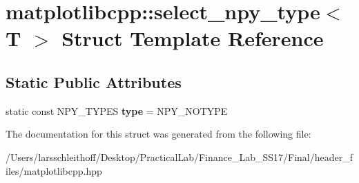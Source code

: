 \hypertarget{structmatplotlibcpp_1_1select__npy__type}{}\section{matplotlibcpp\+:\+:select\+\_\+npy\+\_\+type$<$ T $>$ Struct Template Reference}
\label{structmatplotlibcpp_1_1select__npy__type}
\subsection*{Static Public Attributes}
\begin{DoxyCompactItemize}
\item 
\mbox{\label{structmatplotlibcpp_1_1select__npy__type_acbffa4e6e1d047b52e12330446816c9c}} 
static const N\+P\+Y\+\_\+\+T\+Y\+P\+ES {\bfseries type} = N\+P\+Y\+\_\+\+N\+O\+T\+Y\+PE
\end{DoxyCompactItemize}


The documentation for this struct was generated from the following file\+:\begin{DoxyCompactItemize}
\item 
/\+Users/larsschleithoff/\+Desktop/\+Practical\+Lab/\+Finance\+\_\+\+Lab\+\_\+\+S\+S17/\+Final/header\+\_\+files/matplotlibcpp.\+hpp\end{DoxyCompactItemize}
